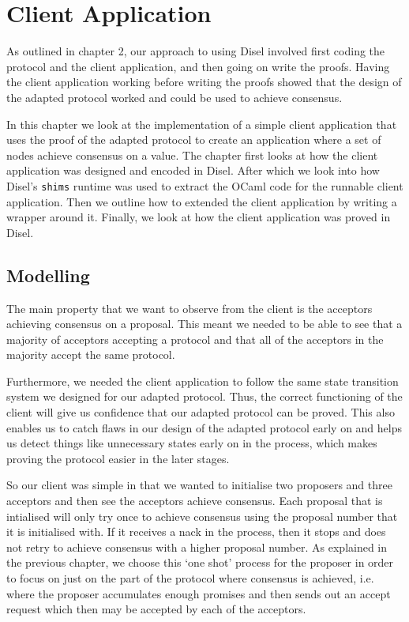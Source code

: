 \chapter{Client Application}
As outlined in chapter 2, our approach to using Disel involved first coding
the protocol and the client application, and then going on write the proofs.
Having the client application working before writing the proofs showed
that the design of the adapted protocol worked and could be used
to achieve consensus.

In this chapter we look at the implementation of a simple client application
that uses the proof of the adapted protocol to create an application where
a set of nodes achieve consensus on a value. The chapter first looks at how the client
application was designed and encoded in Disel. After which we look into how
Disel's \texttt{shims} runtime was used to extract the OCaml code for the
runnable client application. Then we outline how to extended the client
application by writing a wrapper around it. Finally, we look at how the client
application was proved in Disel.

\section{Modelling}

The main property that we want to observe from the client is the acceptors achieving
consensus on a proposal. This meant we needed to be able to see that a majority of
acceptors accepting a protocol and that all of the acceptors in the majority
accept the same protocol.

Furthermore, we needed the client application to follow the same state transition
system we designed for our adapted protocol. Thus, the correct functioning of the
client will give us confidence that our adapted protocol can be proved. This also
enables us to catch flaws in our design of the adapted protocol early on and helps
us detect things like unnecessary states early on in the process, which makes
proving the protocol easier in the later stages.

So our client was simple in that we wanted to initialise two proposers and three
acceptors and then see the acceptors achieve consensus. Each proposal that is intialised
will only try once to achieve consensus using the proposal number that it is initialised
with. If it receives a nack in the process, then it stops and does not retry to
achieve consensus with a higher proposal number. As explained in the previous
chapter, we choose this `one shot' process for the proposer in order to focus on
just on the part of the protocol where consensus is achieved, i.e. where the proposer
accumulates enough promises and then sends out an accept request which then may
be accepted by each of the acceptors.

